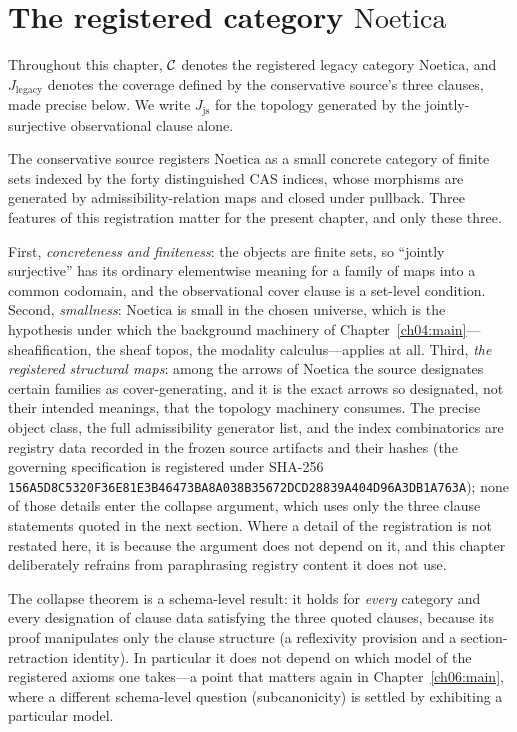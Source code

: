 \section{The registered category $\mathrm{Noetica}$}\label{ch05:sec:noetica}

\begin{notation}\label{ch05:not:legacy}
Throughout this chapter, $\mathcal{C}$ denotes the registered legacy category
$\mathrm{Noetica}$, and $J_{\mathrm{legacy}}$ denotes the coverage defined by
the conservative source's three clauses, made precise below. We write
$J_{\mathrm{js}}$ for the topology generated by the jointly-surjective
observational clause alone.
\end{notation}

The conservative source registers $\mathrm{Noetica}$ as a small concrete
category of finite sets indexed by the forty distinguished CAS indices, whose
morphisms are generated by admissibility-relation maps and closed under
pullback. Three features of this registration matter for the present chapter,
and only these three.

First, \emph{concreteness and finiteness}: the objects are finite sets, so
``jointly surjective'' has its ordinary elementwise meaning for a family of
maps into a common codomain, and the observational cover clause is a
set-level condition. Second, \emph{smallness}: $\mathrm{Noetica}$ is small in
the chosen universe, which is the hypothesis under which the background
machinery of Chapter~\ref{ch04:main}---sheafification, the sheaf topos, the
modality calculus---applies at all. Third, \emph{the registered structural
maps}: among the arrows of $\mathrm{Noetica}$ the source designates certain
families as cover-generating, and it is the exact arrows so designated, not
their intended meanings, that the topology machinery consumes. The precise
object class, the full admissibility generator list, and the index
combinatorics are registry data recorded in the frozen source artifacts and
their hashes (the governing specification is registered under SHA-256
\texttt{156A5D8C5320F36E81E3B46473BA8A038B35672DCD28839A404D96A3DB1A763A});
none of those details enter the collapse argument, which uses only the three
clause statements quoted in the next section. Where a detail of the
registration is not restated here, it is because the argument does not depend
on it, and this chapter deliberately refrains from paraphrasing registry
content it does not use.

\begin{boundary}\label{ch05:bnd:schema}
The collapse theorem is a schema-level result: it holds for \emph{every}
category and every designation of clause data satisfying the three quoted
clauses, because its proof manipulates only the clause structure (a
reflexivity provision and a section-retraction identity). In particular it
does not depend on which model of the registered axioms one takes---a point
that matters again in Chapter~\ref{ch06:main}, where a different schema-level
question (subcanonicity) is settled by exhibiting a particular model.
\end{boundary}


